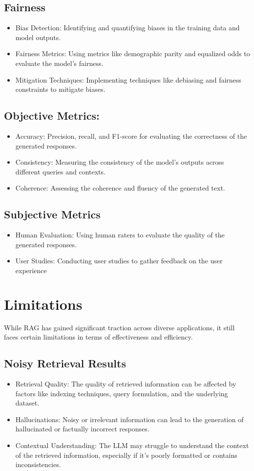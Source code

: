 \subsection{Fairness}
\begin{itemize}
	
	\item Bias Detection: Identifying and quantifying biases in the training data and model outputs.
	\item Fairness Metrics: Using metrics like demographic parity and equalized odds to evaluate the model's fairness.
	\item Mitigation Techniques: Implementing techniques like debiasing and fairness constraints to mitigate biases.
\end{itemize}
\subsection{Objective Metrics:}
\begin{itemize}
	\item Accuracy: Precision, recall, and F1-score for evaluating the correctness of the generated responses.
	\item Consistency: Measuring the consistency of the model's outputs across different queries and contexts.
	\item Coherence: Assessing the coherence and fluency of the generated text.
\end{itemize}
\subsection{Subjective Metrics}
\begin{itemize}
	\item Human Evaluation: Using human raters to evaluate the quality of the generated responses.
	\item User Studies: Conducting user studies to gather feedback on the user experience
\end{itemize}
\section{Limitations}
While RAG has gained significant traction across diverse applications, it still faces certain limitations in terms of effectiveness and efficiency\cite{zhao2024retrieval}.
\subsection{Noisy Retrieval Results}
\begin{itemize}
	\item Retrieval Quality: The quality of retrieved information can be affected by factors like indexing techniques, query formulation, and the underlying dataset.
	\item Hallucinations: Noisy or irrelevant information can lead to the generation of hallucinated or factually incorrect responses.
	\item Contextual Understanding: The LLM may struggle to understand the context of the retrieved information, especially if it's poorly formatted or contains inconsistencies.
\end{itemize}
